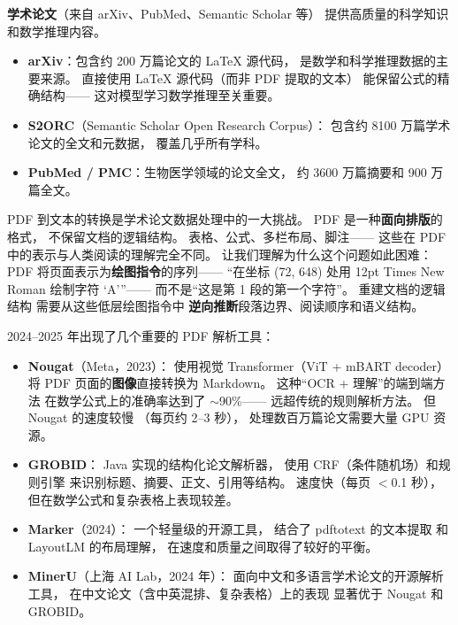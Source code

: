 \textbf{学术论文}（来自 arXiv、PubMed、Semantic Scholar 等）
提供高质量的科学知识和数学推理内容。

\begin{itemize}[noitemsep]
  \item \textbf{arXiv}：包含约 200 万篇论文的 \LaTeX{} 源代码，
        是数学和科学推理数据的主要来源。
        直接使用 \LaTeX{} 源代码（而非 PDF 提取的文本）
        能保留公式的精确结构——
        这对模型学习数学推理至关重要。
  \item \textbf{S2ORC}（Semantic Scholar Open Research Corpus）：
        包含约 8100 万篇学术论文的全文和元数据，
        覆盖几乎所有学科。
  \item \textbf{PubMed / PMC}：生物医学领域的论文全文，
        约 3600 万篇摘要和 900 万篇全文。
\end{itemize}

PDF 到文本的转换是学术论文数据处理中的一大挑战。
PDF 是一种\textbf{面向排版}的格式，
不保留文档的逻辑结构。
表格、公式、多栏布局、脚注——
这些在 PDF 中的表示与人类阅读的理解完全不同。
让我们理解为什么这个问题如此困难：
PDF 将页面表示为\textbf{绘图指令}的序列——
``在坐标 (72, 648) 处用 12pt Times New Roman 绘制字符 `A'\thinspace''——
而不是``这是第 1 段的第一个字符''。
重建文档的逻辑结构
需要从这些低层绘图指令中
\textbf{逆向推断}段落边界、阅读顺序和语义结构。

2024--2025 年出现了几个重要的 PDF 解析工具：

\begin{itemize}[noitemsep]
  \item \textbf{Nougat}（Meta，2023）：
        使用视觉 Transformer（ViT + mBART decoder）
        将 PDF 页面的\textbf{图像}直接转换为 Markdown。
        这种``OCR + 理解''的端到端方法
        在数学公式上的准确率达到了 $\sim$90\%——
        远超传统的规则解析方法。
        但 Nougat 的速度较慢
        （每页约 2--3 秒），
        处理数百万篇论文需要大量 GPU 资源。
  \item \textbf{GROBID}：
        Java 实现的结构化论文解析器，
        使用 CRF（条件随机场）和规则引擎
        来识别标题、摘要、正文、引用等结构。
        速度快（每页 $<$0.1 秒），
        但在数学公式和复杂表格上表现较差。
  \item \textbf{Marker}（2024）：
        一个轻量级的开源工具，
        结合了 pdftotext 的文本提取
        和 LayoutLM 的布局理解，
        在速度和质量之间取得了较好的平衡。
  \item \textbf{MinerU}（上海 AI Lab，2024 年）：%
        面向中文和多语言学术论文的开源解析工具，
        在中文论文（含中英混排、复杂表格）上的表现
        显著优于 Nougat 和 GROBID。
\end{itemize}

